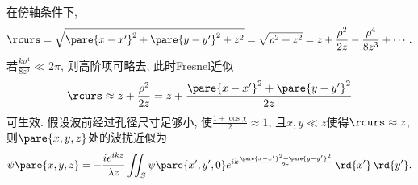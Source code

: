 \documentclass{ctexart}
\begin{document}
在傍轴条件下,
\[ \rcurs = \sqrt{\pare{x-x'}^2 + \pare{y-y'}^2 + z^2} = \sqrt{\rho^2 + z^2} = z + \frac{\rho^2}{2z} - \frac{\rho^4}{8z^3} + \cdots. \]
若$\displaystyle \frac{k\rho^4}{8z^3} \ll 2\pi$, 则高阶项可略去, 此时Fresnel近似
\[ \rcurs \approx z + \frac{\rho^2}{2z} = z + \frac{\pare{x-x'}^2 + \pare{y-y'}^2}{2z} \]
可生效. 假设波前经过孔径尺寸足够小, 使$\displaystyle \frac{1+\cos\chi}{2}\approx 1$, 且$x,y\ll z$使得$\rcurs \approx z$, 则$\pare{x,y,z}$处的波扰近似为
\[ \psi\pare{x,y,z} = -\frac{ie^{ikz}}{\lambda z} \iint_S \psi\pare{x',y',0}e^{ik \frac{\pare{x-x'}^2+\pare{y-y'}^2}{2z}}\,\rd{x'}\,\rd{y'}. \]



\end{document}
